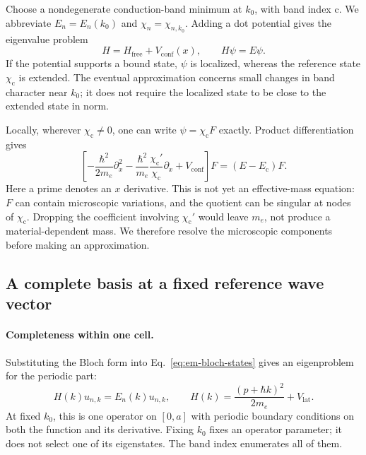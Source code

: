 Choose a nondegenerate conduction-band minimum at $k_0$, with
band index $\mathrm c$. We abbreviate
$E_n=E_n(k_0)$ and $\chi_n=\chi_{n,k_0}$.
Adding a dot potential gives the eigenvalue problem
\begin{equation}
  H=H_{\mathrm{free}}+V_{\mathrm{conf}}(x),
  \qquad H\psi=E\psi.
  \label{eq:em-confined-problem}
\end{equation}
If the potential supports a bound state, $\psi$ is localized,
whereas the reference state $\chi_{\mathrm c}$ is extended.
The eventual approximation concerns small changes in band
character near $k_0$; it does not require the localized state
to be close to the extended state in norm.

Locally, wherever $\chi_{\mathrm c}\ne0$, one can write
$\psi=\chi_{\mathrm c}F$ exactly. Product differentiation gives
\begin{equation}
  \left[-\frac{\hbar^2}{2m_e}\partial_x^2
        -\frac{\hbar^2}{m_e}\frac{\chi_{\mathrm c}'}{\chi_{\mathrm c}}
             \partial_x+V_{\mathrm{conf}}\right]F
       =(E-E_{\mathrm c})F.
  \label{eq:em-exact-quotient}
\end{equation}
Here a prime denotes an $x$ derivative. This is not yet an
effective-mass equation: $F$ can contain microscopic variations,
and the quotient can be singular at nodes of $\chi_{\mathrm c}$.
Dropping the coefficient involving $\chi_{\mathrm c}'$ would
leave $m_e$, not produce a material-dependent mass. We therefore
resolve the microscopic components before making an approximation.

\subsection{A complete basis at a fixed reference wave vector}
\label{sec:em-complete-basis}

\paragraph{Completeness within one cell.}
Substituting the Bloch form into Eq.~\eqref{eq:em-bloch-states}
gives an eigenproblem for the periodic part:
\begin{equation}
  H(k)u_{n,k}=E_n(k)u_{n,k},
  \qquad H(k)=\frac{(p+\hbar k)^2}{2m_e}+V_{\mathrm{lat}}.
  \label{eq:em-cell-hamiltonian}
\end{equation}
At fixed $k_0$, this is one operator on $[0,a]$ with periodic
boundary conditions on both the function and its derivative.
Fixing $k_0$ fixes an operator parameter; it does not select
one of its eigenstates. The band index enumerates all of them.

